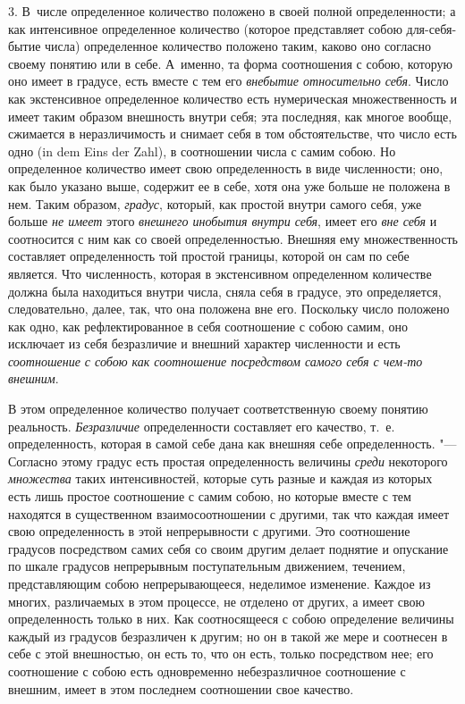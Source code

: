 3. В~числе определенное количество положено в своей полной определенности; а
как интенсивное определенное количество (которое представляет собою
для-себя-бытие числа) определенное количество положено таким, каково оно
согласно своему понятию или в себе. А~именно, та форма соотношения с собою,
которую оно имеет в градусе, есть вместе с тем его
{\em внебытие относительно себя}. Число как
экстенсивное определенное количество есть нумерическая множественность и
имеет таким образом внешность внутри себя; эта последняя, как многое
вообще, сжимается в неразличимость и снимает себя в том обстоятельстве, что
число есть одно (in dem Eins der Zahl), в соотношении числа с самим собою.
Но определенное количество имеет свою определенность в виде численности;
оно, как было указано выше, содержит ее в себе, хотя она уже больше не
положена в нем. Таким образом, {\em градус}, который,
как простой внутри самого себя, уже больше {\em не
имеет} этого {\em внешнего инобытия внутри себя}, имеет
его {\em вне себя} и соотносится с ним как со своей
определенностью. Внешняя ему множественность составляет определенность той
простой границы, которой он сам по себе является. Что численность, которая
в экстенсивном определенном количестве должна была находиться внутри числа,
сняла себя в градусе, это определяется, следовательно, далее, так, что она
положена вне его. Поскольку число положено как одно, как рефлектированное в
себя соотношение с собою самим, оно исключает из себя безразличие и внешний
характер численности и есть {\em соотношение с собою
как соотношение посредством самого себя с чем-то внешним}.

В этом определенное количество получает соответственную своему понятию
реальность. {\em Безразличие} определенности составляет
его качество, т.~е. определенность, которая в самой себе дана как внешняя
себе определенность. "--- Согласно этому градус есть простая определенность
величины {\em среди} некоторого
{\em множества} таких интенсивностей, которые суть
разные и каждая из которых есть лишь простое соотношение с самим собою, но
которые вместе с тем находятся в существенном взаимосоотношении с другими,
так что каждая имеет свою определенность в этой непрерывности с другими.
Это соотношение градусов посредством самих себя со своим другим делает
поднятие и опускание по шкале градусов непрерывным поступательным
движением, течением, представляющим собою непрерывающееся, неделимое
изменение. Каждое из многих, различаемых в этом процессе, не отделено от
других, а имеет свою определенность только в них. Как соотносящееся с собою
определение величины каждый из градусов безразличен к другим; но он в такой
же мере и соотнесен в себе с этой внешностью, он есть то, что он есть,
только посредством нее; его соотношение с собою есть одновременно
небезразличное соотношение с внешним, имеет в этом последнем соотношении
свое качество.


